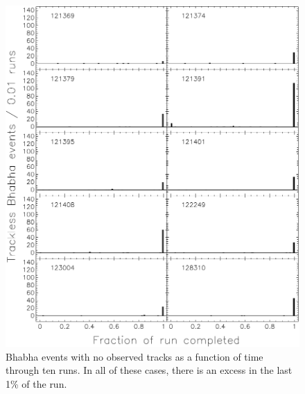 \documentclass{cornell}
\begin{document}
\begin{figure}[p]
  \begin{center}
    \includegraphics[width=0.95\linewidth]{plots/crashruns2}
  \end{center}
  \caption{\label{crashruns2} Bhabha events with no observed tracks as
  a function of time through ten runs.  In all of these cases, there
  is an excess in the last 1\% of the run.}
\end{figure}
\end{document}
